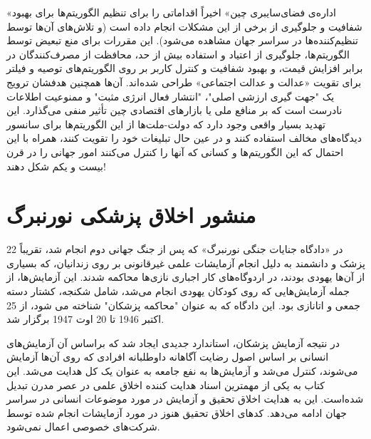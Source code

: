 «اداره‌ی فضای‌سایبری چین» اخیراً اقداماتی را برای تنظیم الگوریتم‌ها برای بهبود شفافیت و جلوگیری از برخی از این مشکلات انجام داده است (و تلاش‌های آن‌ها توسط تنظیم‌کننده‌ها در سراسر جهان مشاهده می‌شود).
این مقررات برای منع تبعیض توسط الگوریتم‌ها، جلوگیری از اعتیاد و استفاده بیش از حد، محافظت از مصرف‌کنندگان در برابر افزایش قیمت، و بهبود شفافیت و کنترل کاربر بر روی الگوریتم‌های توصیه و فیلتر برای تقویت «عدالت و عدالت اجتماعی» طراحی شده‌اند.
آن‌ها همچنین هدفشان ترویج یک "جهت گیری ارزشی اصلی"، "انتشار فعال انرژی مثبت" و ممنوعیت اطلاعات نادرست است که بر منافع ملی یا بازارهای اقتصادی چین تأثیر منفی می‌گذارد.
این تهدید بسیار واقعی وجود دارد که دولت-ملت‌ها از این الگوریتم‌ها برای سانسور دیدگاه‌های مخالف استفاده کنند و در عین حال تبلیغات خود را تقویت کنند، همراه با این احتمال که این الگوریتم‌ها و کسانی که آنها را کنترل می‌کنند امور جهانی را در قرن بیست و یکم شکل دهند!
\newline
\newline



{
\section*{منشور اخلاق پزشکی نورنبرگ}
\label{sec:منشور اخلاق پزشکی نورنبرگ}
در «دادگاه جنایات جنگی نورنبرگ» که پس از جنگ جهانی دوم انجام شد، تقریباً 22 پزشک و دانشمند به دلیل انجام آزمایشات علمی غیرقانونی بر روی زندانیان، که بسیاری از آن‌ها یهودی بودند، در اردوگاه‌های کار اجباری نازی‌ها محاکمه شدند. این آزمایش‌ها، از جمله آزمایش‌هایی که روی کودکان یهودی انجام می‌شد، شامل شکنجه، کشتار دسته جمعی و اتانازی بود. این دادگاه که به عنوان "محاکمه پزشکان" شناخته می شود، از 25 اکتبر 1946 تا 20 اوت 1947 برگزار شد.
}

در نتیجه آزمایش پزشکان، استاندارد جدیدی ایجاد شد که براساس آن آزمایش‌های انسانی بر اساس اصول رضایت آگاهانه داوطلبانه افرادی که روی آن‌ها آزمایش می‌شوند، کنترل می‌شد و آزمایش‌ها به نفع جامعه به عنوان یک کل هدایت می‌شد.
این کتاب به یکی از مهمترین اسناد هدایت کننده اخلاق علمی در عصر مدرن تبدیل شده‌است.
این به هدایت اخلاق تحقیق و آزمایش در مورد موضوعات انسانی در سراسر جهان ادامه می‌دهد.
کدهای اخلاق تحقیق هنوز در مورد آزمایشات انجام شده توسط شرکت‌های خصوصی اعمال نمی‌شود.
\newpage



